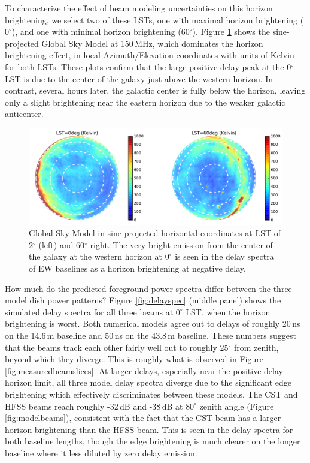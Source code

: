 \documentclass{emulateapj}
\begin{document}
To characterize the effect of beam modeling uncertainties on this horizon brightening, we select two of these LSTs, one with maximal horizon brightening ($0^\circ$), and one with minimal horizon brightening ($60^\circ$). Figure \ref{fig:gsmplots} shows the sine-projected Global Sky Model at 150\,MHz, which dominates the horizon brightening effect, in local Azimuth/Elevation coordinates with units of Kelvin for both LSTs. These plots confirm that the large positive delay peak at the 0$^\circ$ LST is due to the center of the galaxy just above the western horizon. In contrast, several hours later, the galactic center is fully below the horizon, leaving only a slight brightening near the eastern horizon due to the weaker galactic anticenter. 

\begin{figure}[t]
\centering
\includegraphics[width=6in]{gsm_kelvin_LST_2deg_and_62deg.pdf}
\caption{Global Sky Model \citep{gsm} in sine-projected horizontal coordinates at LST of 2$^\circ$ (left) and 60$^\circ$ right. The very bright emission from the center of the galaxy at the western horizon at 0$^\circ$ is seen in the delay spectra of EW baselines as a horizon brightening at negative delay.}
\label{fig:gsmplots}
\end{figure}

How much do the predicted foreground power spectra differ between the three model dish power patterns? Figure \ref{fig:delayspec} (middle panel) shows the simulated delay spectra for all three beams at $0^\circ$ LST, when the horizon brightening is worst. Both numerical models agree out to delays of roughly 20\,ns on the 14.6\,m baseline and 50\,ns on the 43.8\,m baseline. These numbers suggest that the beams track each other fairly well out to roughly 25$^\circ$ from zenith, beyond which they diverge. This is roughly what is observed in Figure \ref{fig:measuredbeamslices}. At larger delays, especially near the positive delay horizon limit, all three model delay spectra diverge due to the significant edge brightening which effectively discriminates between these models. The CST and HFSS beams reach roughly -32\,dB and -38\,dB at $80^\circ$ zenith angle (Figure \ref{fig:modelbeams}), consistent with the fact that the CST beam has a larger horizon brightening than the HFSS beam. This is seen in the delay spectra for both baseline lengths, though the edge brightening is much clearer on the longer baseline where it less diluted by zero delay emission.  
\end{document}
